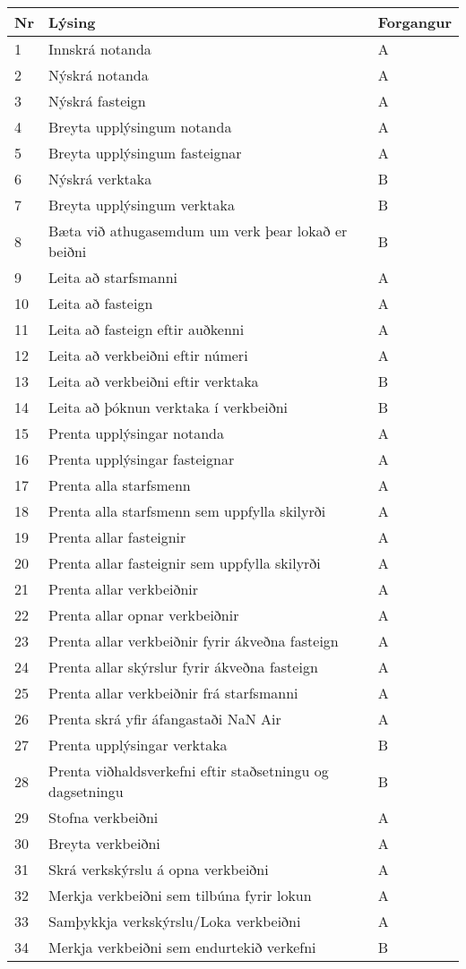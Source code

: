 \documentclass[a4paper]{article}
\begin{document}
\begin{tabular}{|l|l|l|}
\hline
Nr& Lýsing& Forgangur\\
\hline
1& Innskrá notanda & A \\
\hline
2& Nýskrá notanda & A \\
\hline
3& Nýskrá fasteign & A \\
\hline
4& Breyta upplýsingum notanda & A \\
\hline
5& Breyta upplýsingum fasteignar & A \\
\hline
6& Nýskrá verktaka & B \\
\hline
7& Breyta upplýsingum verktaka & B \\
\hline
8& Bæta við athugasemdum um verk þear lokað er beiðni & B \\
\hline
9& Leita að starfsmanni & A \\
\hline
10& Leita að fasteign & A \\
\hline
11& Leita að fasteign eftir auðkenni & A\\
\hline
12& Leita að verkbeiðni eftir númeri & A \\
\hline
13& Leita að verkbeiðni eftir verktaka & B \\
\hline
14& Leita að þóknun verktaka í verkbeiðni & B \\
\hline
15& Prenta upplýsingar notanda & A \\
\hline
16& Prenta upplýsingar fasteignar & A \\
\hline
17& Prenta alla starfsmenn & A \\
\hline
18& Prenta alla starfsmenn sem uppfylla skilyrði & A \\
\hline
19& Prenta allar fasteignir & A \\
\hline
20& Prenta allar fasteignir sem uppfylla skilyrði & A     \\
\hline
21& Prenta allar verkbeiðnir & A \\
\hline
22& Prenta allar opnar verkbeiðnir & A \\
\hline
23& Prenta allar verkbeiðnir fyrir ákveðna fasteign & A \\
\hline
24& Prenta allar skýrslur fyrir ákveðna fasteign & A \\
\hline
25& Prenta allar verkbeiðnir frá starfsmanni & A \\
\hline
26& Prenta skrá yfir áfangastaði NaN Air & A \\
\hline
27& Prenta upplýsingar verktaka & B \\
\hline
28& Prenta viðhaldsverkefni eftir staðsetningu og dagsetningu & B \\
\hline
29& Stofna verkbeiðni & A \\
\hline
30& Breyta verkbeiðni & A \\
\hline
31& Skrá verkskýrslu á opna verkbeiðni & A \\
\hline
32& Merkja verkbeiðni sem tilbúna fyrir lokun & A \\
\hline
33& Samþykkja verkskýrslu/Loka verkbeiðni & A \\
\hline
34& Merkja verkbeiðni sem endurtekið verkefni & B \\
\hline
\end{tabular}
\end{document}
